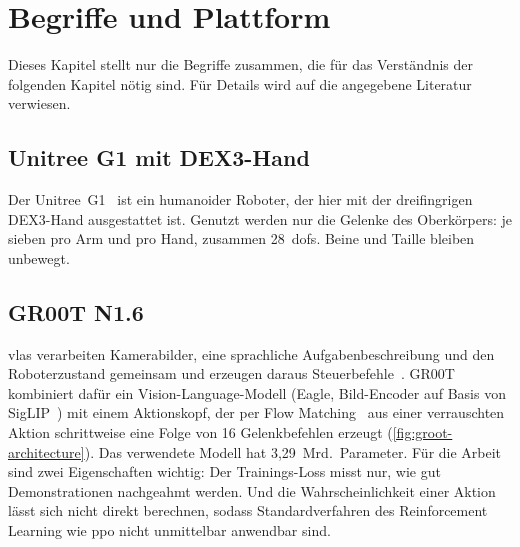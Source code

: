 
\chapter{Begriffe und Plattform}
\label{chap:grundlagen}

Dieses Kapitel stellt nur die Begriffe zusammen, die für das Verständnis der
folgenden Kapitel nötig sind. Für Details wird auf die angegebene Literatur
verwiesen.

\section{Unitree G1 mit DEX3-Hand}
\label{sec:humanoide-robotik}

Der Unitree~G1~\cite{unitree_g1} ist ein humanoider Roboter, der hier mit der
dreifingrigen DEX3-Hand ausgestattet ist. Genutzt werden nur die Gelenke des
Oberkörpers: je sieben pro Arm und pro Hand, zusammen 28~\acp{dof}. Beine und
Taille bleiben unbewegt.

\section{GR00T N1.6}
\label{sec:vla}

\acp{vla} verarbeiten Kamerabilder, eine sprachliche Aufgabenbeschreibung und
den Roboterzustand gemeinsam und erzeugen daraus
Steuerbefehle~\cite{openvla2024}. GR00T~\cite{groot2025} kombiniert dafür ein
Vision-Language-Modell (Eagle, Bild-Encoder auf Basis von
SigLIP~\cite{zhai2023siglip}) mit einem Aktionskopf, der per Flow
Matching~\cite{lipman2023flow} aus einer verrauschten Aktion schrittweise eine
Folge von 16 Gelenkbefehlen erzeugt (\cref{fig:groot-architecture}). Das
verwendete Modell hat 3,29~Mrd.\ Parameter. Für die Arbeit sind zwei
Eigenschaften wichtig: Der Trainings-Loss misst nur, wie gut Demonstrationen
nachgeahmt werden. Und die Wahrscheinlichkeit einer Aktion lässt sich nicht
direkt berechnen, sodass Standardverfahren des Reinforcement Learning wie
\ac{ppo} nicht unmittelbar anwendbar sind.

